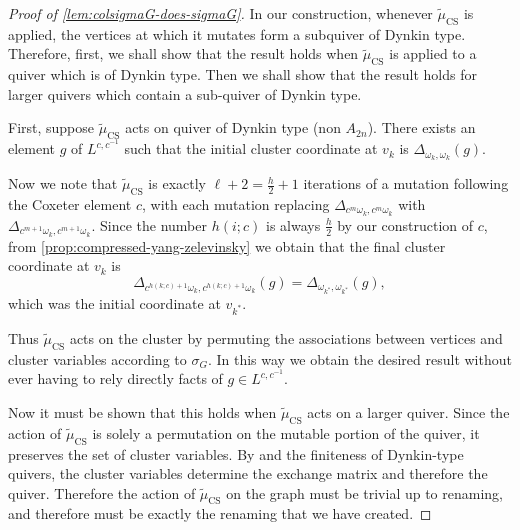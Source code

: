 \documentclass{amsart}
\theoremstyle{plain}
\theoremstyle{definition}
\theoremstyle{remark}
\newcommand{\fundamentalweight}{\omega}
\newcommand{\genminoryz}[3]{\Delta_{{#1} \fundamentalweight_{#3}, {#2}%
    \fundamentalweight_{#3}}}
\newcommand{\muint}[1]{\widetilde{\mu}_{\text{#1}}}
\newcommand{\mucolperm}{\muint{CS}}
\begin{document}
  \begin{proof}[Proof of \cref{lem:colsigmaG-does-sigmaG}]
    In our construction, whenever $\mucolperm$ is applied, the vertices
    at which it mutates form a subquiver of Dynkin type. Therefore,
    first, we shall show that the result holds when $\mucolperm$ is
    applied to a quiver which is of Dynkin type. Then we shall show that
    the result holds for larger quivers which contain a sub-quiver of
    Dynkin type.

    First, suppose $\mucolperm$ acts on quiver of Dynkin type (non
    $A_{2n}$). There exists an element $g$ of $L^{c,c^{-1}}$ such that
    the initial cluster coordinate at $v_k$ is $\genminoryz{}{}{k}(g)$.

    Now we note that $\mucolperm$ is exactly $\ell + 2 = \frac{h}{2} +
    1$ iterations of a mutation following the Coxeter element $c$, with
    each mutation replacing $\genminoryz{c^m}{c^m}{k}$ with
    $\genminoryz{c^{m+1}}{c^{m+1}}{k}$. Since the number $h(i;c)$ is
    always $\frac{h}{2}$ by our construction of $c$, from
    \cref{prop:compressed-yang-zelevinsky} we obtain that the final
    cluster coordinate at $v_k$ is \[ \genminoryz{c^{h(k;c) +
          1}}{c^{h(k;c) + 1}}{k}(g) = \genminoryz{}{}{k^{\ast}}(g), \]
    which was the initial coordinate at $v_{k^{\ast}}$.

    Thus $\mucolperm$ acts on the cluster by permuting the associations
    between vertices and cluster variables according to $\sigma_G$. In
    this way we obtain the desired result without ever having to rely
    directly facts of $g \in L^{c,c^{-1}}$.

    Now it must be shown that this holds when $\mucolperm$ acts on a
    larger quiver. Since the action of $\mucolperm$ is solely a
    permutation on the mutable portion of the quiver, it preserves the
    set of cluster variables. By
    \cite[Theorem~1.12]{fominzelevinsky2003} and the finiteness of
    Dynkin-type quivers, the cluster variables determine the exchange
    matrix and therefore the quiver. Therefore the action of
    $\mucolperm$ on the graph must be trivial up to renaming, and
    therefore must be exactly the renaming that we have created.
  \end{proof}
\end{document}
